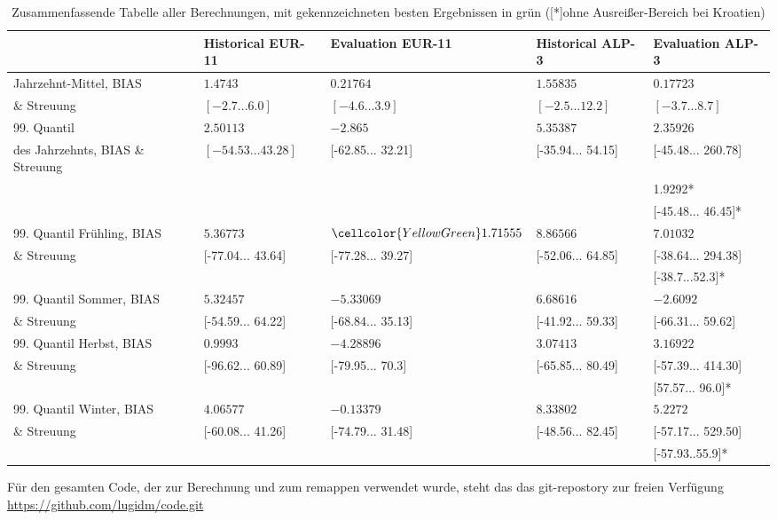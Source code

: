 \begin{table}[h!]
	\begin{tabularx}{\textwidth}{X|X|X|X|X|}
		\cline{2-5}
		& \textbf{Historical EUR-11} & \textbf{Evaluation EUR-11}& \textbf{Historical ALP-3} & \textbf{Evaluation ALP-3}\\
		\hline
		Jahrzehnt-Mittel, BIAS& $1.4743$ & $0.21764$ & $1.55835$ & \cellcolor{YellowGreen}$0.17723$\\
		\cline{2-5} \& Streuung& $[-2.7...6.0]$ & \cellcolor{YellowGreen}$[-4.6...3.9]$ &$[-2.5...12.2]$& $[-3.7...8.7]$\\
		\hline\hline
		99. Quantil& $2.50113$ & $-2.865$ & $5.35387$&\cellcolor{YellowGreen}$2.35926$\\
		\cline{2-5} des Jahrzehnts, BIAS \& Streuung& $[-54.53...43.28]$ &[-62.85... 32.21] &\cellcolor{YellowGreen}[-35.94... 54.15]& [-45.48... 260.78]\\
		\cline{5-5} &&&&\cellcolor{YellowGreen}1.9292*\\
		\cline{5-5}
		&&&&[-45.48... 46.45]* \\
		\hline\hline
		99. Quantil Frühling, BIAS& $5.36773$ & $\cellcolor{YellowGreen}1.71555$ & $8.86566$&$7.01032$\\
		\cline{2-5} \& Streuung	& [-77.04... 43.64] & \cellcolor{YellowGreen}[-77.28... 39.27] & [-52.06... 64.85] & [-38.64... 294.38]\\
		\cline{5-5}&&&&\cellcolor{YellowGreen}[-38.7...52.3]*\\
		\hline
		99. Quantil Sommer, BIAS & $5.32457$ & $-5.33069$ & $6.68616$&\cellcolor{YellowGreen}$-2.6092$\\
		\cline{2-5}  \& Streuung & [-54.59... 64.22] & [-68.84... 35.13] & \cellcolor{YellowGreen}[-41.92... 59.33] & [-66.31... 59.62]\\
		\hline
		99. Quantil Herbst, BIAS & \cellcolor{YellowGreen}$0.9993$ & $-4.28896$ & $3.07413$&$3.16922$\\
		\cline{2-5}\& Streuung& [-96.62... 60.89]& [-79.95... 70.3] & \cellcolor{YellowGreen}[-65.85... 80.49]& [-57.39... 414.30]\\
		\cline{5-5}&&&&[57.57... 96.0]*\\
		\hline
		99. Quantil Winter, BIAS& \cellcolor{YellowGreen}$4.06577$ & $-0.13379$ & $8.33802$&$5.2272$\\
		\cline{2-5}\& Streuung & [-60.08... 41.26] & \cellcolor{YellowGreen}[-74.79... 31.48] & [-48.56... 82.45] & [-57.17... 529.50]\\
		\cline{5-5}&&&&[-57.93..55.9]*\\
		\hline
	\end{tabularx}
	\caption{Zusammenfassende Tabelle aller Berechnungen, mit gekennzeichneten besten Ergebnissen in grün ([*]ohne Ausreißer-Bereich bei Kroatien)}
	\label{tab:appendix}
\end{table}

Für den gesamten Code, der zur Berechnung und zum remappen verwendet wurde, steht das das git-repostory zur freien Verfügung \href{https://github.com/lugidm/code.git}{https://github.com/lugidm/code.git}
